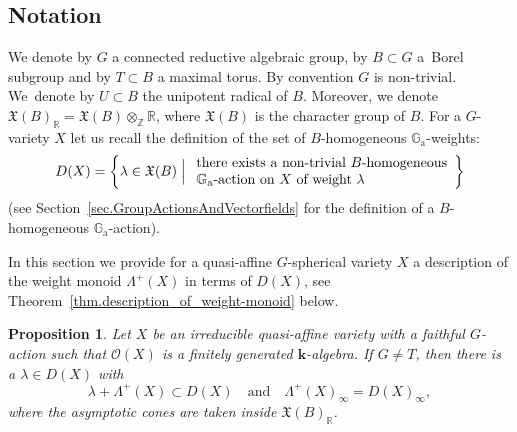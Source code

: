 \documentclass[JEP,XML,SOM,Unicode]{cedram}
\let\mathcal\mathscr
\newcommand{\ra}{\mathrm{a}}
\theoremstyle{plain}
\newtheorem{proposition}[theorem]{Proposition}
\theoremstyle{definition}
\newcommand{\OO}{\mathcal{O}}
\newcommand{\GG}{\mathbb{G}}
\newcommand{\RR}{\mathbb{R}}
\newcommand{\ZZ}{\mathbb{Z}}
\newcommand{\kk}{{\boldsymbol{k}}}
\newcommand{\Bigset}[2]{\biggl\{#1 \Bigm|  #2\biggr\}}
\begin{document}
\subsection*{Notation} We denote by $G$ a connected reductive algebraic group, by $B \subset G$ a~Borel subgroup
and by $T \subset B$ a maximal torus. By convention $G$ is non-trivial.
We~denote by $U \subset B$ the unipotent radical of $B$.
Moreover, we denote $\mathfrak{X}(B)_{\RR} = \mathfrak{X}(B) \otimes_{\ZZ} \RR$, where $\mathfrak{X}(B)$ is the character group of $B$. For a $G$-variety $X$ let us recall the definition of the set of $B$-homogeneous $\GG_\ra$-weights:
\[
D(X) = \Bigset{ \lambda \in \mathfrak{X}(B)}{
\begin{array}{l}
\textrm{there exists a non-trivial $B$-homogeneous} \\
\textrm{$\GG_\ra$-action on $X$ of weight $\lambda$}
\end{array}
}
\]
(see Section~\ref{sec.GroupActionsAndVectorfields} for the definition of a $B$-homogeneous $\GG_\ra$-action).

\medskip

In this section we provide for a quasi-affine $G$-spherical
variety $X$ a description of
the weight monoid $\Lambda^+(X)$ in terms of $D(X)$, see Theorem~\ref{thm.description_of_weight-monoid} below.

\begin{proposition}
\label{prop.weights_Vec_ln^U}
Let $X$ be an irreducible quasi-affine variety with a faithful \hbox{$G$-action} such that $\OO(X)$ is
a finitely generated $\kk$-algebra. If $G \neq T$, then there is a $\lambda \in D(X)$ with
\[
\lambda + \Lambda^+(X) \subset D(X) \quad \textrm{and} \quad
\Lambda^+(X)_{\infty} = D(X)_{\infty},
\]
where the asymptotic cones are taken inside $\mathfrak{X}(B)_{\RR}$.
\end{proposition}
\end{document}
